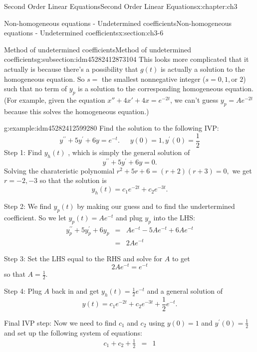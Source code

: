 \documentclass[oneside,10pt,]{book}
\numberwithin{equation}{section}
\numberwithin{equation}{section}
\newcommand{\amp}{&}
\begin{document}
\begin{chapterptx}{Second Order Linear Equations}{}{Second Order Linear Equations}{}{}{x:chapter:ch3}
\begin{sectionptx}{Non-homogeneous equations - Undetermined coefficients}{}{Non-homogeneous equations - Undetermined coefficients}{}{}{x:section:ch3-6}
\begin{subsectionptx}{Method of undetermined coefficients}{}{Method of undetermined coefficients}{}{}{g:subsection:idm45282412873104}
This looks more complicated that it actually is because there's a possibility that \(g(t)\) is actually a solution to the homogeneous equation. So \(s=\) the smallest nonnegative integer (\(s=0,1,\)or \(2\)) such that no term of \(y_{p}\) is a solution to the corresponding homogeneous equation. (For example, given the equation \(x'' + 4x' + 4x = e^{-2t}\), we can't guess \(y_p = A e^{-2t}\) because this solves the homogeneous equation.)%
\begin{example}{}{g:example:idm45282412599280}%
Find the solution to the following IVP:%
\begin{equation*}
y^{\prime\prime}+5y^{\prime}+6y=e^{-t}.\,\,\,\,\,\,\,\,\,y(0)=1,y^{\prime}(0)=\frac{1}{2}
\end{equation*}
Step 1: Find \(y_{h}(t)\) , which is simply the general solution of%
\begin{equation*}
y^{\prime\prime}+5y^{\prime}+6y=0.
\end{equation*}
Solving the charateristic polynomial \(r^{2}+5r+6=(r+2)(r+3)= 0,\) we get \(r=-2,-3\) so that the solution is%
\begin{equation*}
y_{h}(t)=c_{1}e^{-2t}+c_{2}e^{-3t}.
\end{equation*}
%
\par
Step 2: We find \(y_{p}(t)\) by making our guess and to find the undertermined coefficient. So we let \(y_{p}(t)=Ae^{-t}\) and plug \(y_{p}\) into the LHS:%
\begin{align*}
y_{p}^{\prime\prime}+5y_{p}^{\prime}+6y_{p} \amp = \amp Ae^{-t}-5Ae^{-t}+6Ae^{-t}\\
\amp = \amp 2Ae^{-t}
\end{align*}
%
\par
Step 3: Set the LHS equal to the RHS and solve for \(A\) to get%
\begin{equation*}
2Ae^{-t}=e^{-t}
\end{equation*}
so that \(A=\frac{1}{2}\).%
\par
Step 4: Plug \(A\) back in and get \(y_{h}(t)=\frac{1}{2}e^{-t}\) and a general solution of%
\begin{equation*}
y(t)=c_{1}e^{-2t}+c_{2}e^{-3t}+\frac{1}{2}e^{-t}.
\end{equation*}
%
\par
Final IVP step: Now we need to find \(c_{1}\) and \(c_{2}\) using \(y(0)=1\) and \(y^{\prime}(0)=\frac{1}{2}\) and set up the following system of equations:%
\begin{align*}
c_{1}+c_{2}+\frac{1}{2} \amp = \amp 1\\

\end{align*}
\end{example}
\end{subsectionptx}
\end{sectionptx}
\end{chapterptx}
\end{document}
